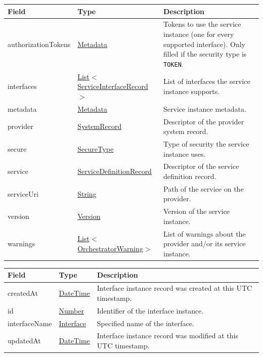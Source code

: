 \documentclass[a4paper]{arrowhead}
\newcommand{\pref}[1]{{\textcolor{ArrowheadGrey}{\hyperref[sec:model:primitives:#1]{#1}}}}
\begin{document}
\clearpage

\label{sec:model:OrchestrationResult}

\begin{table}[ht!]
\begin{tabularx}{\textwidth}{| p{4cm} | p{4.5cm} | X |} \hline
\rowcolor{gray!33} Field & Type & Description \\ \hline
authorizationTokens & \hyperref[sec:model:Metadata]{Metadata} & Tokens to use the service instance (one for every supported interface). Only filled if the security type is \texttt{TOKEN}. \\ \hline
interfaces & \pref{List}$<$\hyperref[sec:model:ServiceInterfaceRecord]{ServiceInterfaceRecord}$>$ & List of interfaces the service instance supports. \\ \hline
metadata & \hyperref[sec:model:Metadata]{Metadata} & Service instance metadata. \\ \hline
provider & \hyperref[sec:model:SystemRecord]{SystemRecord} & Descriptor of the provider system record. \\ \hline
secure & \pref{SecureType} & Type of security the service instance uses. \\ \hline
service & \hyperref[sec:model:ServiceDefinitionRecord]{ServiceDefinitionRecord} & Descriptor of the service definition record. \\ \hline
serviceUri & \pref{String} & Path of the service on the provider. \\ \hline
version & \pref{Version} & Version of the service instance. \\ \hline
warnings & \pref{List}$<$\pref{OrchestratorWarning}$>$ & List of warnings about the provider and/or its service instance. \\ \hline
\end{tabularx}
\end{table}

\label{sec:model:ServiceInterfaceRecord}

\begin{table}[ht!]
\begin{tabularx}{\textwidth}{| p{4.25cm} | p{3.5cm} | X |} \hline
\rowcolor{gray!33} Field & Type & Description \\ \hline
createdAt & \pref{DateTime} & Interface instance record was created at this UTC time\-stamp. \\ \hline
id & \pref{Number} & Identifier of the interface instance. \\ \hline
interfaceName &\pref{Interface} & Specified name of the interface. \\ \hline
updatedAt & \pref{DateTime} & Interface instance record was modified at this UTC time\-stamp. \\ \hline
\end{tabularx}
\end{table}
\end{document}

